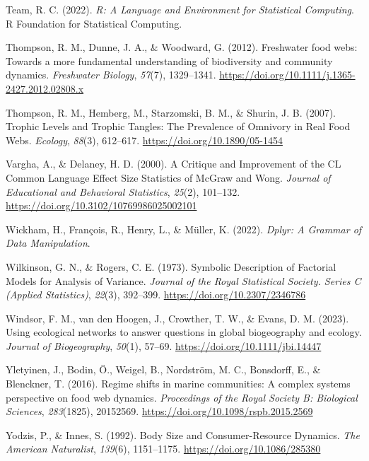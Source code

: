 \documentclass[
]{article}
\newlength{\cslhangindent}
\newlength{\cslentryspacingunit} %
\newenvironment{CSLReferences}[2] %
 {%
  \setlength{\parindent}{0pt}
  \ifodd #1
  \let\oldpar\par
  \def\par{\hangindent=\cslhangindent\oldpar}
  \fi
  \setlength{\parskip}{#2\cslentryspacingunit}
 }%
 {}
\begin{document}
\begin{CSLReferences}{1}{0}
\leavevmode{}%
Team, R. C. (2022). \emph{R: {A Language} and {Environment} for
{Statistical Computing}}. R Foundation for Statistical Computing.

\leavevmode{}%
Thompson, R. M., Dunne, J. A., \& Woodward, G. (2012). Freshwater food
webs: Towards a more fundamental understanding of biodiversity and
community dynamics. \emph{Freshwater Biology}, \emph{57}(7), 1329--1341.
\url{https://doi.org/10.1111/j.1365-2427.2012.02808.x}

\leavevmode{}%
Thompson, R. M., Hemberg, M., Starzomski, B. M., \& Shurin, J. B.
(2007). Trophic {Levels} and {Trophic Tangles}: {The Prevalence} of
{Omnivory} in {Real Food Webs}. \emph{Ecology}, \emph{88}(3), 612--617.
\url{https://doi.org/10.1890/05-1454}

\leavevmode{}%
Vargha, A., \& Delaney, H. D. (2000). A {Critique} and {Improvement} of
the {CL Common Language Effect Size Statistics} of {McGraw} and {Wong}.
\emph{Journal of Educational and Behavioral Statistics}, \emph{25}(2),
101--132. \url{https://doi.org/10.3102/10769986025002101}

\leavevmode{}%
Wickham, H., François, R., Henry, L., \& Müller, K. (2022). \emph{Dplyr:
{A Grammar} of {Data Manipulation}}.

\leavevmode{}%
Wilkinson, G. N., \& Rogers, C. E. (1973). Symbolic {Description} of
{Factorial Models} for {Analysis} of {Variance}. \emph{Journal of the
Royal Statistical Society. Series C (Applied Statistics)}, \emph{22}(3),
392--399. \url{https://doi.org/10.2307/2346786}

\leavevmode{}%
Windsor, F. M., van den Hoogen, J., Crowther, T. W., \& Evans, D. M.
(2023). Using ecological networks to answer questions in global
biogeography and ecology. \emph{Journal of Biogeography}, \emph{50}(1),
57--69. \url{https://doi.org/10.1111/jbi.14447}

\leavevmode{}%
Yletyinen, J., Bodin, Ö., Weigel, B., Nordström, M. C., Bonsdorff, E.,
\& Blenckner, T. (2016). Regime shifts in marine communities: A complex
systems perspective on food web dynamics. \emph{Proceedings of the Royal
Society B: Biological Sciences}, \emph{283}(1825), 20152569.
\url{https://doi.org/10.1098/rspb.2015.2569}

\leavevmode{}%
Yodzis, P., \& Innes, S. (1992). Body {Size} and {Consumer-Resource
Dynamics}. \emph{The American Naturalist}, \emph{139}(6), 1151--1175.
\url{https://doi.org/10.1086/285380}

\end{CSLReferences}
\end{document}
